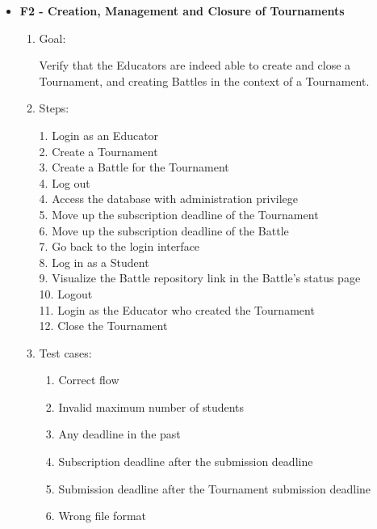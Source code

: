 \documentclass{Configuration_Files/Template}
\begin{document}
\begin{itemize}
    \item \textbf{F2 - Creation, Management and Closure of Tournaments}
    
    \begin{enumerate}
    
        \item Goal:
        
        Verify that the Educators are indeed able to create and close a Tournament, and creating Battles in the context of a Tournament.
        
        \item Steps:
        
            1. Login as an Educator\\
            2. Create a Tournament\\
            3. Create a Battle for the Tournament\\
            4. Log out\\
            4. Access the database with administration privilege\\
            5. Move up the subscription deadline of the Tournament\\
            6. Move up the subscription deadline of the Battle\\
            7. Go back to the login interface\\
            8. Log in as a Student\\
            9. Visualize the Battle repository link in the Battle's status page\\
            10. Logout\\
            11. Login as the Educator who created the Tournament\\
            12. Close the Tournament 
        
        \item Test cases:
        
        \begin{enumerate}
        
            \item Correct flow
            \item Invalid maximum number of students
            \item Any deadline in the past
            \item Subscription deadline after the submission deadline
            \item Submission deadline after the Tournament submission deadline
            \item Wrong file format
    

\end{enumerate}
\end{enumerate}
\end{itemize}
\end{document}
